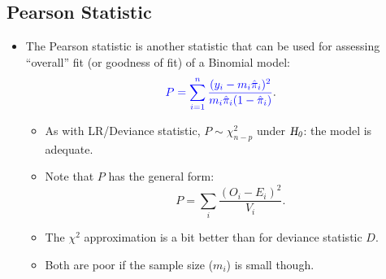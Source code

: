 \documentclass[oneside]{book}\usepackage[]{graphicx}\usepackage[svgnames]{xcolor}
\newcommand{\HN}{\textsl{H}_{\textsl{0}}}%
\begin{document}
\subsection*{Pearson Statistic}
\begin{itemize}
      \item The Pearson statistic is another statistic that can be used for assessing
            ``overall'' fit (or goodness of fit) of a Binomial model:
            \[ \textcolor{Blue}{P=\sum_{i=1}^{n} \frac{(y_i-m_i\hat{\pi}_i)^2}{m_i\hat{\pi}_i(1-\hat{\pi}_i)}}. \]
            \begin{itemize}
                  \item As with LR/Deviance statistic, $ P \sim \chi^2_{n-p} $ under $ \HN $: the model is adequate.
                  \item Note that $ P $ has the general form:
                        \[ P=\sum_{i}\frac{(O_i-E_i)^2}{V_i}.   \]
                  \item The $ \chi^2 $ approximation is a bit better than for deviance statistic $ D $.
                  \item Both are poor if the sample size ($ m_i $) is small though.
            \end{itemize}
\end{itemize}
\end{document}
